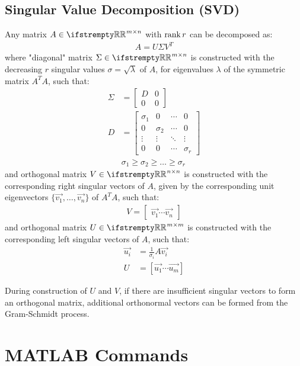 \documentclass[12pt, a4paper]{article}
\begin{document}
\begin{multicols*}{3}
\subsection{Singular Value Decomposition (SVD)}
Any matrix $A \in \RR^{m{\times}n}$ with $\operatorname{rank} r$ can be decomposed as:
\begin{align*}
A = U{\Sigma}V^T
\end{align*}
where "diagonal" matrix $\Sigma \in \RR^{m{\times}n}$ is constructed with the decreasing $r$ singular values $\sigma = \sqrt{\lambda}$ of $A$, for eigenvalues $\lambda$ of the symmetric matrix $A^TA$, such that:
\begin{align*}
  \Sigma &= \begin{bmatrix}D & 0 \\ 0 & 0\end{bmatrix} \\
  D &= \begin{bmatrix}\sigma_1 & 0 & \cdots & 0 \\ 0 & \sigma_2 & \cdots & 0 \\ \vdots & \vdots & \ddots & \vdots \\ 0 & 0 & \cdots & \sigma_r\end{bmatrix} \\
    & \sigma_1 \geq \sigma_2 \geq \ldots \geq \sigma_r 
\end{align*}
and orthogonal matrix $V \in \RR^{n{\times}n}$ is constructed with the corresponding right singular vectors of $A$, given by the corresponding unit eigenvectors $\{\vec{v_1},\ldots,\vec{v_n}\}$ of $A^TA$, such that:
\begin{align*}
  V = \begin{bmatrix}\vec{v_1} \cdots \vec{v_n}\end{bmatrix}
\end{align*}
and orthogonal matrix $U \in \RR^{m{\times}m}$ is constructed with the corresponding left singular vectors of $A$, such that:
\begin{align*}
  \vec{u_i} &= \frac{1}{\sigma_i}A\vec{v_i} \\
  U &= [\vec{u_1} \cdots \vec{u_m}]
\end{align*}

During construction of $U$ and $V$, if there are insufficient singular vectors to form an orthogonal matrix, additional orthonormal vectors can be formed from the Gram-Schmidt process.

\colbreak
\section*{MATLAB Commands}


\end{multicols*}
\end{document}
